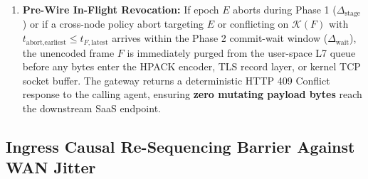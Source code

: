 \documentclass[conference,10pt]{IEEEtran}
\begin{document}
\begin{enumerate}
    \item \textbf{Pre-Wire In-Flight Revocation:} If epoch $E$ aborts during Phase 1 ($\Delta_{\text{stage}}$) or if a cross-node policy abort targeting $E$ or conflicting on $\mathcal{K}(F)$ with $t_{\text{abort,earliest}} \le t_{F,\text{latest}}$ arrives within the Phase 2 commit-wait window ($\Delta_{\text{wait}}$), the unencoded frame $F$ is immediately purged from the user-space L7 queue before any bytes enter the HPACK encoder, TLS record layer, or kernel TCP socket buffer. The gateway returns a deterministic HTTP 409 Conflict response to the calling agent, ensuring \textbf{zero mutating payload bytes} reach the downstream SaaS endpoint.
\end{enumerate}

\subsection{Ingress Causal Re-Sequencing Barrier Against WAN Jitter}
\end{document}
